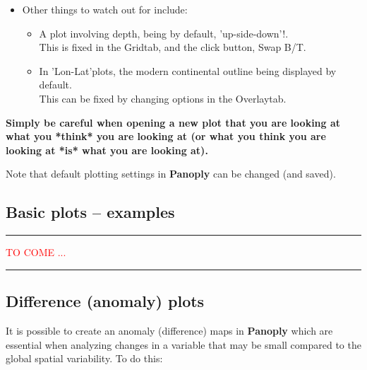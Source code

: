 \documentclass[11pt,fleqn]{book} %
\begin{document}
\begin{itemize}
\vspace{1mm}
\item Other things to watch out for include:
\begin{itemize}
\item A plot involving depth, being by default, 'up-side-down'!.
\\This is fixed in the \footnotesize\textsf{Grid}\normalsize tab, and the click button, \footnotesize\textsf{Swap B/T}\normalsize.
\item In \footnotesize\textsf{'Lon-Lat'}\normalsize plots, the modern continental outline being displayed by default.
\\This can be fixed by changing options in the \footnotesize\textsf{Overlay}\normalsize tab.
\end{itemize}

\end{itemize}
\vspace{2mm}

\begin{center}
\textbf{Simply be careful when opening a new plot that you are looking at what you *think* you are looking at (or what you think you are looking at *is* what you are looking at).}
\end{center}

Note that default plotting settings in \textbf{Panoply} can be changed (and saved).


\subsection{Basic plots -- examples}

\vspace{1mm}
\noindent\rule{4cm}{0.5pt}
\vspace{2mm}

\noindent\textcolor{red}{TO COME ...}

\vspace{1mm}
\noindent\rule{4cm}{0.5pt}
\vspace{2mm}


\subsection{Difference (anomaly) plots}

It is possible to create an anomaly (difference) maps in \textbf{Panoply} which are essential when analyzing changes in a variable that may be small compared to the global spatial variability. To do this:
\end{document}

